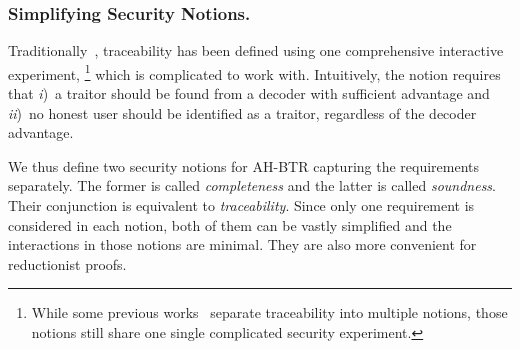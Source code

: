 \subsubsection{Simplifying Security Notions.}
Traditionally~\cite{EC:BonSahWat06}, traceability has been defined using one comprehensive interactive experiment,%
\footnote{While some previous works~\cite{C:BonFra99,STOC:GoyKopWat18,C:Zhandry20} separate traceability into multiple notions,
those notions still share one single complicated security experiment.}
which is complicated to work with.
Intuitively, the notion requires that
\emph{i})~a traitor should be found from a decoder with sufficient advantage and
\emph{ii})~no honest user should be identified as a traitor, regardless of the decoder advantage.

We thus define two security notions for AH-BTR capturing the requirements separately.
The former is called \emph{completeness} and the latter is called \emph{soundness}.
Their conjunction is equivalent to \emph{traceability}.
Since only one requirement is considered in each notion,
both of them can be vastly simplified and the interactions in those notions are minimal.
They are also more convenient for reductionist proofs.
